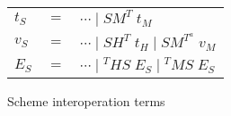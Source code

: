 \begin{figure}
\begin{center}
\begin{tabular}{lcl}
$t_{S}$ & $=$ & $\cdots\;\vert\;SM^{T}\;t_{M}$ \\
$v_{S}$ & $=$ & $\cdots\;\vert\;SH^{T}\;t_{H}\;\vert\;SM^{T^{a}}\;v_{M}$ \\
$E_{S}$ & $=$ & $\cdots\;\vert\;^{T}HS\;E_{S}\;\vert\;^{T}MS\;E_{S}$
\end{tabular}
\end{center}
\caption{Scheme interoperation terms}
\label{fig:sit}
\end{figure}